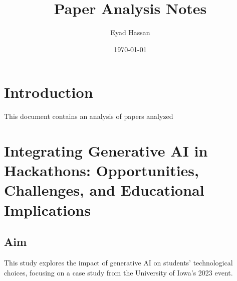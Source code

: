 \documentclass{article}
\title{Paper Analysis Notes}
\author{Eyad Hassan}
\date{\today}
\begin{document}
\maketitle

\section{Introduction}
This document contains an analysis of papers analyzed

\newpage


\newpage


\newpage


\newpage


\newpage


\newpage


\newpage


\newpage


\newpage


\newpage


\newpage


\newpage
\section{Integrating Generative AI in Hackathons: Opportunities, Challenges, and Educational Implications}

\subsection{Aim}
This study explores the impact of generative AI on students' technological choices, focusing on a case study from the University of Iowa's 2023 event.
\end{document}
